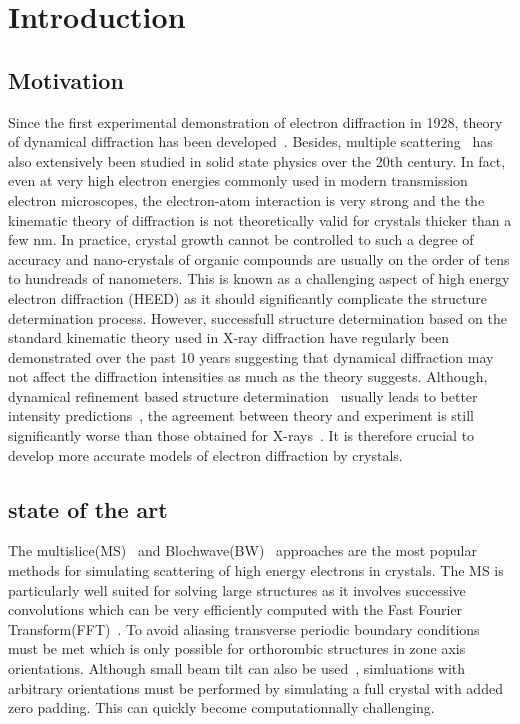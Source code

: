 
\section{Introduction}

\subsection{Motivation}
Since the first experimental demonstration of electron diffraction in 1928,
theory of dynamical diffraction has been developed~\cite{Bethe1928,CowleyBook}.
Besides, multiple scattering~\cite{Korringa1947,Kohn1954,Korringa1994,Dederichs1971}
has also extensively been studied in solid state physics over the 20th century.
In fact, even at very high electron energies commonly used in modern transmission electron
microscopes, the electron-atom interaction is very strong and the the kinematic
theory of diffraction is not theoretically valid for crystals thicker than a
few nm\cite{GlaeserDowning1993,SubramanianSpence2015}. In practice, crystal
growth cannot be controlled to such a degree of accuracy and nano-crystals
of organic compounds are usually on the order of tens to hundreads of nanometers.
This is known as a challenging aspect of high energy electron diffraction (HEED) as it
should significantly complicate the structure determination process.
However, successfull structure determination based on the standard kinematic
theory used in X-ray diffraction have regularly been demonstrated over the
past 10 years\cite{Nannenga2014,Nannenga2019} suggesting that dynamical diffraction may
not affect the diffraction intensities as much as the theory suggests.
Although, dynamical refinement based structure determination~\cite{Palatinus2013} usually
leads to better intensity predictions~\cite{Gemmi2019b}, the agreement
between theory and experiment is still significantly worse than those obtained
for X-rays~\cite{Oleynikov2007}. It is therefore crucial to develop more
accurate models of electron diffraction by crystals.

\subsection{state of the art}
The multislice(MS)~\cite{CowleyMoodie1957} and Blochwave(BW)~\cite{Bethe1928}
approaches are the most popular methods for simulating scattering of high energy
electrons in crystals.
The MS is particularly well suited for solving large structures as it involves
successive convolutions which can be very efficiently computed with the Fast
Fourier Transform(FFT)~\cite{Ishizuka1977}. To avoid aliasing transverse periodic
boundary conditions must be met which is only possible for orthorombic
structures in zone axis orientations. Although small beam tilt can also be
used~\cite{Ishizuka1982,ChenDyck1997}, simluations with arbitrary orientations
must be performed by simulating a full crystal with added zero padding. This
can quickly become computationnally challenging.


